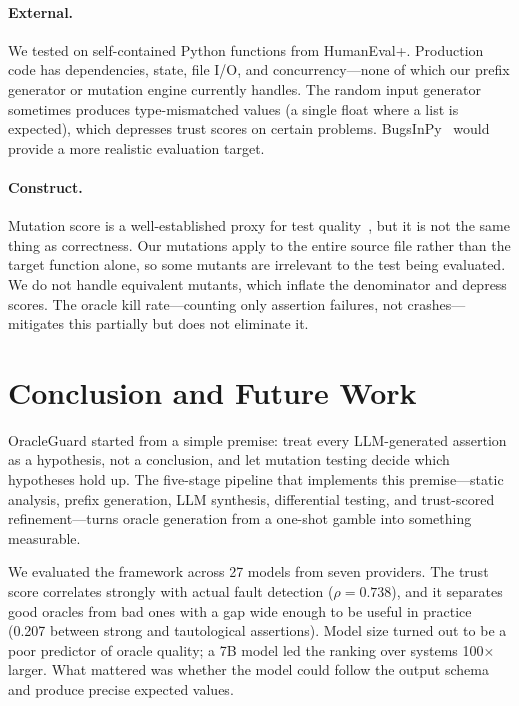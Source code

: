 \documentclass[conference]{IEEEtran}
\begin{document}
\paragraph{External.} We tested on self-contained Python functions from HumanEval+. Production code has dependencies, state, file I/O, and concurrency---none of which our prefix generator or mutation engine currently handles. The random input generator sometimes produces type-mismatched values (a single float where a list is expected), which depresses trust scores on certain problems. BugsInPy~\cite{widyasari2020bugsinpy} would provide a more realistic evaluation target.

\paragraph{Construct.} Mutation score is a well-established proxy for test quality~\cite{jia2011mutation,papadakis2019mutation}, but it is not the same thing as correctness. Our mutations apply to the entire source file rather than the target function alone, so some mutants are irrelevant to the test being evaluated. We do not handle equivalent mutants, which inflate the denominator and depress scores. The oracle kill rate---counting only assertion failures, not crashes---mitigates this partially but does not eliminate it.

\section{Conclusion and Future Work}

OracleGuard started from a simple premise: treat every LLM-generated assertion as a hypothesis, not a conclusion, and let mutation testing decide which hypotheses hold up. The five-stage pipeline that implements this premise---static analysis, prefix generation, LLM synthesis, differential testing, and trust-scored refinement---turns oracle generation from a one-shot gamble into something measurable.

We evaluated the framework across 27 models from seven providers. The trust score correlates strongly with actual fault detection ($\rho = 0.738$), and it separates good oracles from bad ones with a gap wide enough to be useful in practice (0.207 between strong and tautological assertions). Model size turned out to be a poor predictor of oracle quality; a 7B model led the ranking over systems 100$\times$ larger. What mattered was whether the model could follow the output schema and produce precise expected values.
\end{document}
